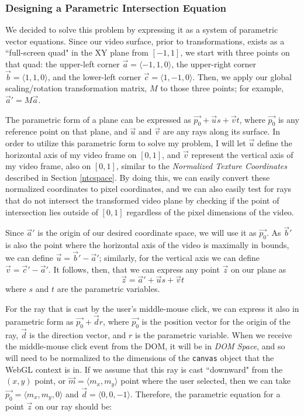 \subsubsection{Designing a Parametric Intersection Equation}
    We decided to solve this problem by expressing it as a system of parametric vector equations.\cite{parametriceq} Since our video surface, prior to transformations, exists as a ``full-screen quad" in the XY plane from $[-1,1]$, we start with three points on that quad: the upper-left corner $\vec{a}=\langle-1,1,0\rangle$, the upper-right corner $\vec{b}=\langle1,1,0\rangle$, and the lower-left corner $\vec{c}=\langle1,-1,0\rangle$. Then, we apply our global scaling/rotation transformation matrix, $M$ to those three points; for example, $\vec{a}'=M\vec{a}$.\par
    The parametric form of a plane can be expressed as $\vec{p_0}+\vec{u}s+\vec{v}t$, where $\vec{p_0}$ is any reference point on that plane, and $\vec{u}$ and $\vec{v}$ are any rays along its surface. In order to utilize this parametric form to solve my problem, I will let $\vec{u}$ define the horizontal axis of my video frame on $[0,1]$, and $\vec{v}$ represent the vertical axis of my video frame, also on $[0,1]$, similar to the \emph{Normalized Texture Coordinates} described in Section \ref{ntcspace}. By doing this, we can easily convert these normalized coordinates to pixel coordinates, and we can also easily test for rays that do not intersect the transformed video plane by checking if the point of intersection lies outside of $[0,1]$ regardless of the pixel dimensions of the video.\par
    Since $\vec{a}'$ is the origin of our desired coordinate space, we will use it as $\vec{p_0}$. As $\vec{b}'$ is also the point where the horizontal axis of the video is maximally in bounds, we can define $\vec{u}=\vec{b}'-\vec{a}'$; similarly, for the vertical axis we can define $\vec{v}=\vec{c}'-\vec{a}'$. It follows, then, that we can express any point $\vec{z}$ on our plane as
    \begin{equation}
    \vec{z}=\vec{a}'+\vec{u}s+\vec{v}t
    \end{equation}
where $s$ and $t$ are the parametric variables.\par
    For the ray that is cast by the user's middle-mouse click, we can express it also in parametric form as $\vec{p_0}+\vec{d}r$, where $\vec{p_0}$ is the position vector for the origin of the ray, $\vec{d}$ is the direction vector, and $r$ is the parametric variable. When we receive the middle-mouse click event from the DOM, it will be in \emph{DOM Space}, and so will need to be normalized to the dimensions of the \texttt{canvas} object that the WebGL context is in. If we assume that this ray is cast ``downward" from the $(x,y)$ point, or $\vec{m}=\langle m_x, m_y \rangle$ point where the user selected, then we can take $\vec{p_0}=\langle m_x, m_y, 0 \rangle$ and $\vec{d}=\langle 0, 0, -1 \rangle$. Therefore, the parametric equation for a point $\vec{z}$ on our ray should be:
